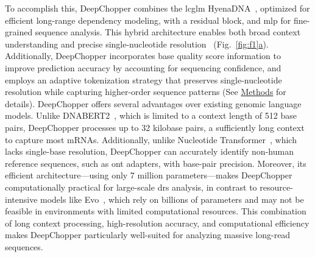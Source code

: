 \documentclass[pdflatex,sn-nature, lineno]{sn-jnl}%
\newcommand{\figref}[2]{Fig.~\hyperref[#1]{\ref*{#1}#2}}
\theoremstyle{thmstyleone}%
\theoremstyle{thmstyletwo}%
\theoremstyle{thmstylethree}%
\begin{document}
To accomplish this, DeepChopper combines the \gls{lcglm} HyenaDNA~\cite{nguyen2024hyenadna}, optimized for efficient long-range dependency modeling, with a residual block, and \gls{mlp} for fine-grained sequence analysis.
This hybrid architecture enables both broad context understanding and precise single-nucleotide resolution~\cite{poli2023hyena, he2016deep} (\figref{fig:f1}{a}).
Additionally, DeepChopper incorporates base quality score information to improve prediction accuracy by accounting for sequencing confidence, and employs an adaptive tokenization strategy that preserves single-nucleotide resolution while capturing higher-order sequence patterns (See \hyperref[sec:methods]{Methods} for details).
DeepChopper offers several advantages over existing genomic language models.
Unlike DNABERT2~\cite{zhou2023dnabert2}, which is limited to a context length of 512 base pairs, DeepChopper processes up to 32 kilobase pairs, a sufficiently long context to capture most mRNAs.
Additionally, unlike Nucleotide Transformer~\cite{dalla2023nucleotide}, which lacks single-base resolution, DeepChopper can accurately identify non-human reference sequences, such as \gls{ont} adapters, with base-pair precision. 
Moreover, its efficient architecture—using only 7 million parameters—makes DeepChopper computationally practical for large-scale \gls{drs} analysis, in contrast to resource-intensive models like Evo~\cite{nguyen2024sequence}, which rely on billions of parameters and may not be feasible in environments with limited computational resources.
This combination of long context processing, high-resolution accuracy, and computational efficiency makes DeepChopper particularly well-suited for analyzing massive long-read sequences.
\end{document}
